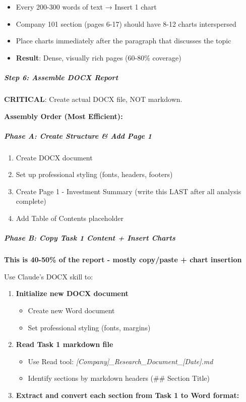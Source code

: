 \documentclass[11pt]{article}
\begin{document}
\begin{itemize}[leftmargin=*,itemsep=2pt,topsep=2pt]
\item {} Every 200-300 words of text → Insert 1 chart
\item {} Company 101 section (pages 6-17) should have 8-12 charts interspersed
\item {} Place charts immediately after the paragraph that discusses the topic
\item {} \textbf{Result}: Dense, visually rich pages (60-80\% coverage)
\end{itemize}

\subparagraph{Step 6: Assemble DOCX Report}\mbox{}\par

\textbf{CRITICAL}: Create actual DOCX file, NOT markdown.


\textbf{Assembly Order (Most Efficient):}


\subparagraph{Phase A: Create Structure \& Add Page 1}\mbox{}\par
\begin{enumerate}[leftmargin=*,itemsep=2pt,topsep=2pt]
\item {} Create DOCX document
\item {} Set up professional styling (fonts, headers, footers)
\item {} Create Page 1 - Investment Summary (write this LAST after all analysis complete)
\item {} Add Table of Contents placeholder
\end{enumerate}

\subparagraph{Phase B: Copy Task 1 Content + Insert Charts}\mbox{}\par
\textbf{This is 40-50\% of the report - mostly copy/paste + chart insertion}


Use Claude's DOCX skill to:


\begin{enumerate}[leftmargin=*,itemsep=2pt,topsep=2pt]
\item {} \textbf{Initialize new DOCX document}
\begin{itemize}[leftmargin=*,itemsep=2pt,topsep=2pt]
\item {} Create new Word document
\item {} Set professional styling (fonts, margins)
\end{itemize}
\item {} \textbf{Read Task 1 markdown file}
\begin{itemize}[leftmargin=*,itemsep=2pt,topsep=2pt]
\item {} Use Read tool: \emph{[Company]\_\allowbreak{}Research\_\allowbreak{}Document\_\allowbreak{}[Date].md}
\item {} Identify sections by markdown headers (\#\# Section Title)
\end{itemize}
\item {} \textbf{Extract and convert each section from Task 1 to Word format:}
\end{enumerate}
\end{document}
